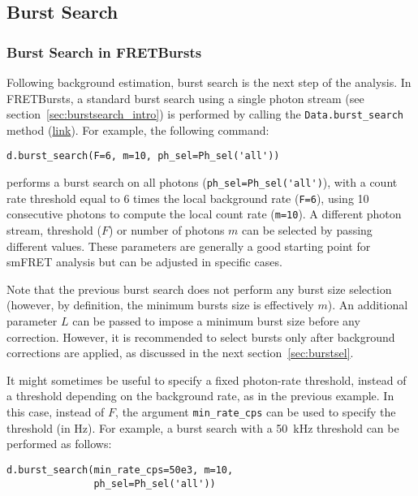 \subsection{Burst Search}
\label{sec:burstsearch}

\subsubsection{Burst Search in FRETBursts}
\label{sec:burstsearch_code}

Following background estimation, burst search is the next step of
the analysis.
In FRETBursts, a standard burst search using a single photon stream
(see section~\ref{sec:burstsearch_intro}) is performed by calling the
\verb|Data.burst_search| method
(\href{http://fretbursts.readthedocs.org/en/latest/data_class.html#fretbursts.burstlib.Data.burst_search}{link}).
For example, the following command:

\begin{lstlisting}
d.burst_search(F=6, m=10, ph_sel=Ph_sel('all'))
\end{lstlisting}

performs a burst search on all photons
(\verb|ph_sel=Ph_sel('all')|), with a count rate threshold equal to 6 times the
local background rate (\verb|F=6|), using 10 consecutive photons to compute the
local count rate (\verb|m=10|).
A different photon stream, threshold ($F$) or number of photons $m$ can be selected by passing different values. These parameters
are generally a good starting point for smFRET analysis but can be adjusted in
specific cases.

Note that the previous burst search does not perform any burst size selection (however, by definition, the minimum bursts size is effectively $m$).
An additional parameter $L$ can be passed to impose a minimum burst
size before any correction.
However, it is recommended to select bursts only after background corrections
are applied, as discussed in the next section~\ref{sec:burstsel}.

It might sometimes be useful to specify a fixed photon-rate threshold, instead
of a threshold depending on the background rate, as in the previous example. In
this case, instead of $F$, the argument \verb|min_rate_cps| can be used to
specify the threshold (in Hz). For example, a burst search with a 50~kHz
threshold can be performed as follows:

\begin{lstlisting}
d.burst_search(min_rate_cps=50e3, m=10, 
               ph_sel=Ph_sel('all'))
\end{lstlisting}

